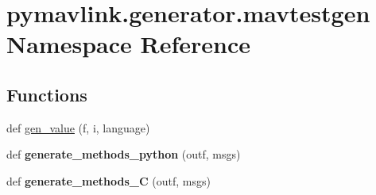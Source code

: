 \hypertarget{namespacepymavlink_1_1generator_1_1mavtestgen}{}\section{pymavlink.\+generator.\+mavtestgen Namespace Reference}
\label{namespacepymavlink_1_1generator_1_1mavtestgen}
\subsection*{Functions}
\begin{DoxyCompactItemize}
\item 
def \hyperlink{namespacepymavlink_1_1generator_1_1mavtestgen_ab5f7ec934669efadef3e9665c35a4866}{gen\+\_\+value} (f, i, language)
\item 
\mbox{\label{namespacepymavlink_1_1generator_1_1mavtestgen_a383a0b2b58cf23c93d38588c1a63b0f0}} 
def {\bfseries generate\+\_\+methods\+\_\+python} (outf, msgs)
\item 
\mbox{\label{namespacepymavlink_1_1generator_1_1mavtestgen_aea36216fc3d20f573590548aeee1a08f}} 
def {\bfseries generate\+\_\+methods\+\_\+C} (outf, msgs)
\end{DoxyCompactItemize}
